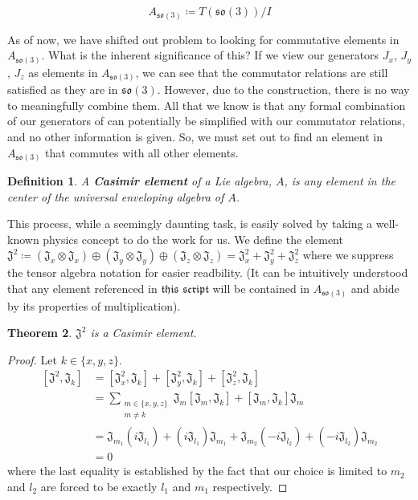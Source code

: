 \documentclass[10pt]{ucthesis}
\newtheorem{definition}{Definition}[chapter]
\newtheorem{theorem}[definition]{Theorem}
\begin{document}
$$A_{\mathfrak{so}(3)} \coloneq T(\mathfrak{so}(3)) / I$$

As of now, we have shifted out problem to looking for commutative elements in $A_{\mathfrak{so}(3)}$. What is the inherent significance of this? If we view our generators $J_x$, $J_y$, $J_z$ as elements in $A_{\mathfrak{so}(3)}$, we can see that the commutator relations are still satisfied as they are in $\mathfrak{so}(3)$. However, due to the construction, there is no way to meaningfully combine them. All that we know is that any formal combination of our generators of can potentially be simplified with our commutator relations, and no other information is given. So, we must set out to find an element in $A_{\mathfrak{so}(3)}$ that commutes with all other elements.

\begin{definition}
	A \textbf{Casimir element} of a Lie algebra, $A$, is any element in the center of the universal enveloping algebra of $A$.
\end{definition}

This process, while a seemingly daunting task, is easily solved by taking a well-known physics concept to do the work for us. We define the element $\mathfrak{J^2} \coloneq (\mathfrak{J}_x \otimes \mathfrak{J}_x) \oplus (\mathfrak{J}_y \otimes \mathfrak{J}_y) \oplus (\mathfrak{J}_z \otimes \mathfrak{J}_z) = \mathfrak{J}_x^2 + \mathfrak{J}_y^2 + \mathfrak{J}_z^2$ where we suppress the tensor algebra notation for easier readbility. (It can be intuitively understood that any element referenced in $\mathfrak{this}$ $\mathfrak{script}$ will be contained in $A_{\mathfrak{so}(3)}$ and abide by its properties of multiplication).

\begin{theorem}
	$\mathfrak{J^2}$ is a Casimir element.
\end{theorem}

\noindent \begin{proof} Let $k\in \{x,y,z\}$.
\begin{equation}
\begin{aligned}
	[\mathfrak{J^2}, \mathfrak{J}_k] &= [\mathfrak{J}_x^2, \mathfrak{J}_k] + [\mathfrak{J}_y^2, \mathfrak{J}_k] + [\mathfrak{J}_z^2, \mathfrak{J}_k]\\
										 &=\sum_{\substack{m\in\{x,y,z\} \\ m\neq k}} \mathfrak{J}_m [\mathfrak{J}_m, \mathfrak{J}_k] + [\mathfrak{J}_m, \mathfrak{J}_k]\mathfrak{J}_m\\
										&= \mathfrak{J}_{m_1}(i\mathfrak{J}_{l_1})+ (i\mathfrak{J}_{l_1}) \mathfrak{J}_{m_1} + \mathfrak{J}_{m_2}(-i\mathfrak{J}_{l_2}) +(-i\mathfrak{J}_{l_2}) \mathfrak{J}_{m_2} \\
										&= 0
\end{aligned}
\end{equation}
where the last equality is established by the fact that our choice is limited to $m_2$ and $l_2$ are forced to be exactly $l_1$ and $m_1$ respectively. \end{proof}
\end{document}
